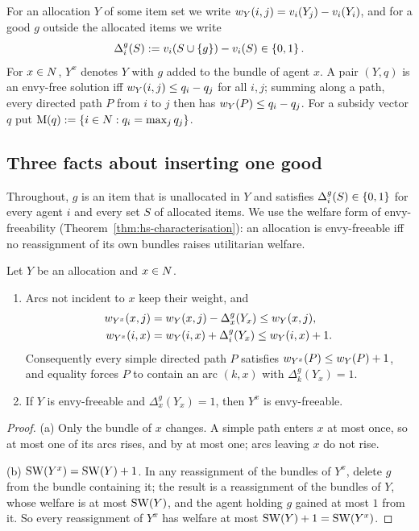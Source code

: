 For an allocation $Y$ of some item set we write
$w_{Y}(i,j)=v_i(Y_j)-v_i(Y_i)$, and for a good $g$ outside the allocated
items we write
\[
  \Delta_i^g(S):=v_i(S\cup\left\{g\right\})-v_i(S)\in\left\{0,1\right\}.
\]
For $x\in N$, $Y^x$ denotes $Y$ with $g$ added to the bundle of agent $x$.
A pair $(Y,q)$ is an envy-free solution iff $w_{Y}(i,j)\le q_i-q_j$ for all
$i,j$; summing along a path, every directed path $P$ from $i$ to $j$ then has
$w_{Y}(P)\le q_i-q_j$. For a subsidy vector $q$ put
$\mathrm{M}(q):=\left\{i\in N: q_i=\max_j q_j\right\}$.

\subsection{Three facts about inserting one good}

Throughout, $g$ is an item that is unallocated in $Y$ and satisfies
$\Delta_i^g(S)\in\left\{0,1\right\}$ for every agent $i$ and every set $S$ of allocated
items. We use the welfare form of envy-freeability
(Theorem~\ref{thm:hs-characterisation}): an allocation is envy-freeable iff no
reassignment of its own bundles raises utilitarian welfare.

\begin{lemma}
\label{lem:os-claims}
Let $Y$ be an allocation and $x\in N$.
\begin{enumerate}
  \item[(a)] Arcs not incident to $x$ keep their weight, and
        \begin{align*}
          w_{Y^x}(x,j)&=w_{Y}(x,j)-\Delta_x^g(Y_x)\le w_{Y}(x,j),\\
          w_{Y^x}(i,x)&=w_{Y}(i,x)+\Delta_i^g(Y_x)\le w_{Y}(i,x)+1 .
        \end{align*}
        Consequently every simple directed path $P$ satisfies
        $w_{Y^x}(P)\le w_{Y}(P)+1$, and equality forces $P$ to contain
        an arc $(k,x)$ with $\Delta_k^g(Y_x)=1$.
  \item[(b)] If $Y$ is envy-freeable and $\Delta_x^g(Y_x)=1$, then $Y^x$ is
        envy-freeable.
\end{enumerate}
\end{lemma}

\begin{proof}
(a) Only the bundle of $x$ changes. A simple path enters $x$ at most once, so
at most one of its arcs rises, and by at most one; arcs leaving $x$ do not
rise.

(b) $\mathrm{SW}(Y^x)=\mathrm{SW}(Y)+1$. In any reassignment of the bundles of $Y^x$, delete
$g$ from the bundle containing it; the result is a reassignment of the bundles
of $Y$, whose welfare is at most $\mathrm{SW}(Y)$, and the agent holding $g$ gained at
most $1$ from it. So every reassignment of $Y^x$ has welfare at most
$\mathrm{SW}(Y)+1=\mathrm{SW}(Y^x)$.
\end{proof}

